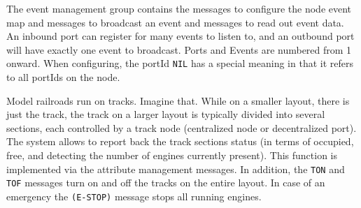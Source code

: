 
The event management group contains the messages to configure the node event map and messages to broadcast an event and messages to read out event data. An inbound port can register for many events to listen to, and an outbound port will have exactly one event to broadcast. Ports and Events are numbered from 1 onward. When configuring, the portId \texttt{NIL} has a special meaning in that it refers to all portIds on the node.

\begin{table}[ht!]
    \centering 
\end{table}


Model railroads run on tracks. Imagine that. While on a smaller layout, there is just the track, the track on a larger layout is typically divided into several sections, each controlled by a track node \textnormal{(centralized node or decentralized port)}. The system allows to report back the track sections status \textnormal{(in terms of occupied, free, and detecting the number of engines currently present)}. This function is implemented via the attribute management messages. In addition, the \texttt{TON} and \texttt{TOF} messages turn on and off the tracks on the entire layout. In case of an emergency the \texttt{(E-STOP)} message stops all running engines. 

\begin{table}[ht!]
    \centering 
\end{table}

